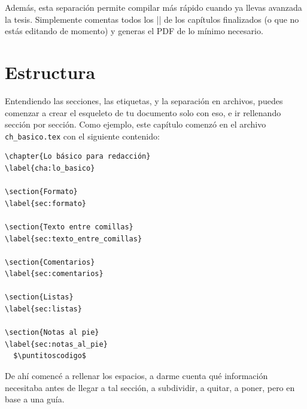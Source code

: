 Además, esta separación permite compilar más rápido cuando ya llevas avanzada la tesis. Simplemente comentas todos los || de los capítulos finalizados (o que no estás editando de momento) y generas el PDF de lo mínimo necesario.



\section{Estructura}
\label{sec:estructura}



Entendiendo las secciones, las etiquetas, y la separación en archivos, puedes comenzar a crear el esqueleto de tu documento solo con eso, e ir rellenando sección por sección. Como ejemplo, este capítulo comenzó en el archivo \texttt{ch\_basico.tex} con el siguiente contenido:

\begin{lstlisting}[style=latex,numbers=none]
\chapter{Lo básico para redacción}
\label{cha:lo_basico}

\section{Formato}
\label{sec:formato}

\section{Texto entre comillas}
\label{sec:texto_entre_comillas}

\section{Comentarios}
\label{sec:comentarios}

\section{Listas}
\label{sec:listas}

\section{Notas al pie}
\label{sec:notas_al_pie}
  $\puntitoscodigo$
\end{lstlisting}

De ahí comencé a rellenar los espacios, a darme cuenta qué información necesitaba antes de llegar a tal sección, a subdividir, a quitar, a poner, pero en base a una guía.

